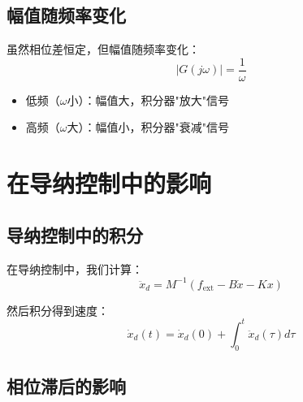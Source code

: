 \documentclass[12pt,a4paper]{article}
\begin{document}
\subsection{幅值随频率变化}

虽然相位差恒定，但幅值随频率变化：
\begin{equation}
|G(j\omega)| = \frac{1}{\omega}
\end{equation}

\begin{itemize}
\item 低频（$\omega$小）：幅值大，积分器"放大"信号
\item 高频（$\omega$大）：幅值小，积分器"衰减"信号
\end{itemize}

\section{在导纳控制中的影响}

\subsection{导纳控制中的积分}

在导纳控制中，我们计算：
\begin{equation}
\ddot{x}_d = M^{-1}(f_{\text{ext}} - B\dot{x} - Kx)
\end{equation}

然后积分得到速度：
\begin{equation}
\dot{x}_d(t) = \dot{x}_d(0) + \int_0^t \ddot{x}_d(\tau) d\tau
\end{equation}

\subsection{相位滞后的影响}
\end{document}
